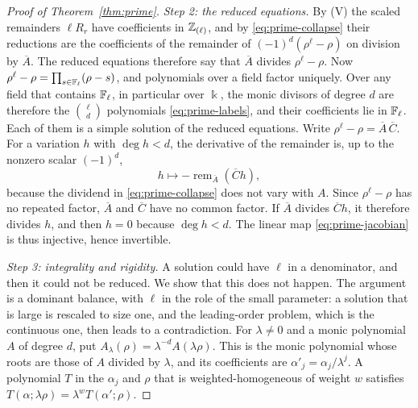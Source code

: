 \begin{proof}[Proof of Theorem~\ref{thm:prime}]
\emph{Step 2: the reduced equations.} By \textup{(V)} the scaled
remainders \(\ell R_r\) have coefficients in \(\mathbb Z_{(\ell)}\), and by
\eqref{eq:prime-collapse} their reductions are the coefficients of the
remainder of \((-1)^d(\rho^\ell-\rho)\) on division by \(\overline A\).
The reduced equations therefore say that \(\overline A\) divides
\(\rho^\ell-\rho\). Now \(\rho^\ell-\rho=\prod_{s\in\mathbb F_\ell}(\rho-s)\),
and polynomials over a field factor uniquely. Over any field that
contains \(\mathbb F_\ell\), in particular over \(\Bbbk\), the monic divisors
of degree \(d\) are therefore the \(\binom{\ell}{d}\) polynomials
\eqref{eq:prime-labels}, and their coefficients lie in \(\mathbb F_\ell\).
Each of them is a simple solution of the reduced equations. Write
\(\rho^\ell-\rho=\overline A\,\overline C\). For a variation \(h\) with
\(\deg h<d\), the derivative of the remainder is, up to the nonzero
scalar \((-1)^d\),
\begin{equation}\label{eq:prime-jacobian}
 h\longmapsto-\operatorname{rem}_{\overline A}(\overline Ch),
\end{equation}
because the dividend in \eqref{eq:prime-collapse} does not vary with
\(A\). Since \(\rho^\ell-\rho\) has no repeated factor, \(\overline A\)
and \(\overline C\) have no common factor. If \(\overline A\) divides
\(\overline Ch\), it therefore divides \(h\), and then \(h=0\) because
\(\deg h<d\). The linear map \eqref{eq:prime-jacobian} is thus
injective, hence invertible.

\emph{Step 3: integrality and rigidity.} A solution could have \(\ell\)
in a denominator, and then it could not be reduced. We show that this
does not happen. The argument is a dominant balance, with \(\ell\) in
the role of the small parameter: a solution that is large is rescaled to
size one, and the leading-order problem, which is the continuous one,
then leads to a contradiction. For \(\lambda\ne0\) and a monic
polynomial \(A\) of degree \(d\), put
\(A_\lambda(\rho)=\lambda^{-d}A(\lambda\rho)\). This is the monic
polynomial whose roots are those of \(A\) divided by \(\lambda\), and
its coefficients are \(\alpha'_j=\alpha_j/\lambda^j\). A polynomial
\(T\) in the \(\alpha_j\) and \(\rho\) that is weighted-homogeneous of
weight \(w\) satisfies
\(T(\alpha;\lambda\rho)=\lambda^{w}T(\alpha';\rho)\).


\end{proof}
